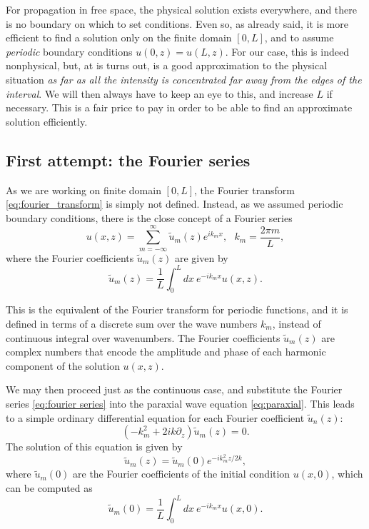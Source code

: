 \documentclass[a4paper,10pt]{report}
\begin{document}
For propagation in free space, the physical solution exists everywhere, and there is no boundary on which to set conditions. Even so, as already said, it is more efficient to find a solution only on the finite domain $[0,L]$, and to assume \textit{periodic} boundary conditions $u(0,z) = u(L,z)$. For our case, this is indeed nonphysical, but, at is turns out, is a good approximation to the physical situation \textit{as far as all the intensity is concentrated far away from the edges of the interval}. We will then always have to keep an eye to this, and increase $L$ if necessary. This is a fair price to pay in order to be able to find an approximate solution efficiently.

\subsection{First attempt: the Fourier series}

As we are working on finite domain $[0,L]$, the Fourier transform \eqref{eq:fourier_transform} is simply not defined. Instead, as we assumed periodic boundary conditions, there is the close concept of a Fourier series
\begin{equation}
    \label{eq:fourier series}
    u(x,z) = \sum_{m=-\infty}^{\infty} \tilde{u}_m(z) e^{i k_m x}, \ \ \ k_m = \frac{2\pi m}{L},
\end{equation}
where the Fourier coefficients $\tilde{u}_m(z)$ are given by
\begin{equation}
    \tilde{u}_m(z) = \frac{1}{L} \int_0^L dx \ e^{-i k_m x} u(x,z).
\end{equation}

This is the equivalent of the Fourier transform for periodic functions, and it is defined in terms of a discrete sum over the wave numbers $k_m$, instead of continuous integral over wavenumbers. The Fourier coefficients $\tilde{u}_m(z)$ are complex numbers that encode the amplitude and phase of each harmonic component of the solution $u(x,z)$.

We may then proceed just as the continuous case, and substitute the Fourier series \eqref{eq:fourier series} into the paraxial wave equation \eqref{eq:paraxial}. This leads to a simple ordinary differential equation for each Fourier coefficient $\tilde{u}_n(z)$:
\begin{equation}
    \left( -k_m^2 + 2ik \partial_z \right) \tilde{u}_m(z) = 0.
\end{equation}
The solution of this equation is given by
\begin{equation}
    \label{eq:solution_paraxial_fourier_discrete}
    \tilde{u}_m(z) = \tilde{u}_m(0) e^{-i k_m^2 z / 2k},
\end{equation}
where $\tilde{u}_m(0)$ are the Fourier coefficients of the initial condition $u(x,0)$, which can be computed as
\begin{equation}
    \tilde{u}_m(0) = \frac{1}{L} \int_0^L dx \ e^{-i k_m x} u(x,0).
\end{equation}
\end{document}
